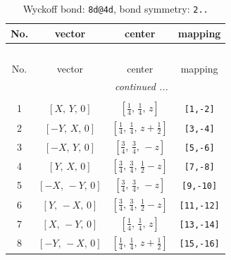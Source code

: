 \documentclass[fleqn,8pt]{jsarticle}
\begin{document}
\begin{longtable}{cccc}
\caption{Wyckoff bond: {\tt 8d@4d}, bond symmetry: {\tt 2..}}
 \\
 \hline \hline
No. & vector & center & mapping \\ \hline \endfirsthead

\multicolumn{3}{l}{\tablename\ \thetable{}} \\
 \hline \hline
No. & vector & center & mapping \\ \hline \endhead

 \hline \hline
\multicolumn{3}{r}{\footnotesize\it continued ...} \\ \endfoot

 \hline \hline
\multicolumn{3}{r}{} \\ \endlastfoot

1 & $\left[ X,\, Y,\, 0 \right]$ & $\left[ \frac{1}{4},\, \frac{1}{4},\, z \right]$ & {\tt [1,-2]} \\ \hline
2 & $\left[ - Y,\, X,\, 0 \right]$ & $\left[ \frac{1}{4},\, \frac{1}{4},\, z + \frac{1}{2} \right]$ & {\tt [3,-4]} \\ \hline
3 & $\left[ - X,\, Y,\, 0 \right]$ & $\left[ \frac{3}{4},\, \frac{3}{4},\, - z \right]$ & {\tt [5,-6]} \\ \hline
4 & $\left[ Y,\, X,\, 0 \right]$ & $\left[ \frac{3}{4},\, \frac{3}{4},\, \frac{1}{2} - z \right]$ & {\tt [7,-8]} \\ \hline
5 & $\left[ - X,\, - Y,\, 0 \right]$ & $\left[ \frac{3}{4},\, \frac{3}{4},\, - z \right]$ & {\tt [9,-10]} \\ \hline
6 & $\left[ Y,\, - X,\, 0 \right]$ & $\left[ \frac{3}{4},\, \frac{3}{4},\, \frac{1}{2} - z \right]$ & {\tt [11,-12]} \\ \hline
7 & $\left[ X,\, - Y,\, 0 \right]$ & $\left[ \frac{1}{4},\, \frac{1}{4},\, z \right]$ & {\tt [13,-14]} \\ \hline
8 & $\left[ - Y,\, - X,\, 0 \right]$ & $\left[ \frac{1}{4},\, \frac{1}{4},\, z + \frac{1}{2} \right]$ & {\tt [15,-16]} \\
\end{longtable}
\renewcommand{\arraystretch}{1.2}
\end{document}
